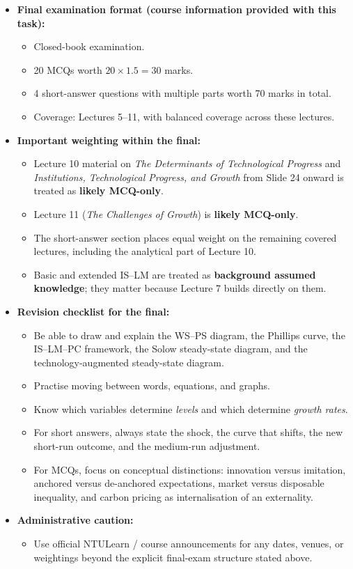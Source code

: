 \documentclass[12pt]{article}
\begin{document}
\begin{itemize}[leftmargin=1.5em]
\item \textbf{Final examination format (course information provided with this task):}
\begin{itemize}
\item Closed-book examination.
\item 20 MCQs worth $20\times 1.5 = 30$ marks.
\item 4 short-answer questions with multiple parts worth 70 marks in total.
\item Coverage: Lectures 5--11, with balanced coverage across these lectures.
\end{itemize}

\item \textbf{Important weighting within the final:}
\begin{itemize}
\item Lecture 10 material on \emph{The Determinants of Technological Progress} and \emph{Institutions, Technological Progress, and Growth} from Slide 24 onward is treated as \textbf{likely MCQ-only}.
\item Lecture 11 (\emph{The Challenges of Growth}) is \textbf{likely MCQ-only}.
\item The short-answer section places equal weight on the remaining covered lectures, including the analytical part of Lecture 10.
\item Basic and extended IS--LM are treated as \textbf{background assumed knowledge}; they matter because Lecture 7 builds directly on them.
\end{itemize}

\item \textbf{Revision checklist for the final:}
\begin{itemize}
\item Be able to draw and explain the WS--PS diagram, the Phillips curve, the IS--LM--PC framework, the Solow steady-state diagram, and the technology-augmented steady-state diagram.
\item Practise moving between words, equations, and graphs.
\item Know which variables determine \emph{levels} and which determine \emph{growth rates}.
\item For short answers, always state the shock, the curve that shifts, the new short-run outcome, and the medium-run adjustment.
\item For MCQs, focus on conceptual distinctions: innovation versus imitation, anchored versus de-anchored expectations, market versus disposable inequality, and carbon pricing as internalisation of an externality.
\end{itemize}

\item \textbf{Administrative caution:}
\begin{itemize}
\item Use official NTULearn / course announcements for any dates, venues, or weightings beyond the explicit final-exam structure stated above.
\end{itemize}
\end{itemize}
\end{document}

